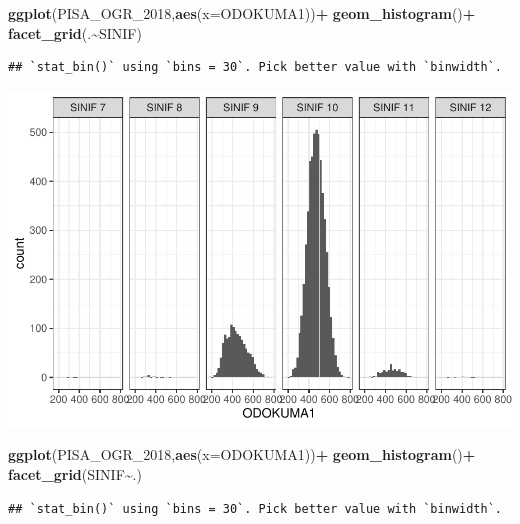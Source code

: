 \documentclass[
  oneside]{book}
\newenvironment{Shaded}{\begin{snugshade}}{\end{snugshade}}
\newcommand{\AttributeTok}[1]{\textcolor[rgb]{0.13,0.29,0.53}{#1}}
\newcommand{\FunctionTok}[1]{\textcolor[rgb]{0.13,0.29,0.53}{\textbf{#1}}}
\newcommand{\NormalTok}[1]{#1}
\newcommand{\SpecialCharTok}[1]{\textcolor[rgb]{0.81,0.36,0.00}{\textbf{#1}}}
\begin{document}
\begin{Shaded}
\begin{Highlighting}[]
\FunctionTok{ggplot}\NormalTok{(PISA\_OGR\_2018,}\FunctionTok{aes}\NormalTok{(}\AttributeTok{x=}\NormalTok{ODOKUMA1))}\SpecialCharTok{+}
  \FunctionTok{geom\_histogram}\NormalTok{()}\SpecialCharTok{+}
  \FunctionTok{facet\_grid}\NormalTok{(.}\SpecialCharTok{\textasciitilde{}}\NormalTok{SINIF)}
\end{Highlighting}
\end{Shaded}

\begin{verbatim}
## `stat_bin()` using `bins = 30`. Pick better value with `binwidth`.
\end{verbatim}

\begin{center}\includegraphics[width=1\linewidth]{15-betimleyici-istatistik_files/figure-latex/unnamed-chunk-34-1} \end{center}

\begin{Shaded}
\begin{Highlighting}[]
\FunctionTok{ggplot}\NormalTok{(PISA\_OGR\_2018,}\FunctionTok{aes}\NormalTok{(}\AttributeTok{x=}\NormalTok{ODOKUMA1))}\SpecialCharTok{+}
  \FunctionTok{geom\_histogram}\NormalTok{()}\SpecialCharTok{+}
  \FunctionTok{facet\_grid}\NormalTok{(SINIF}\SpecialCharTok{\textasciitilde{}}\NormalTok{.)}
\end{Highlighting}
\end{Shaded}

\begin{verbatim}
## `stat_bin()` using `bins = 30`. Pick better value with `binwidth`.
\end{verbatim}
\end{document}
